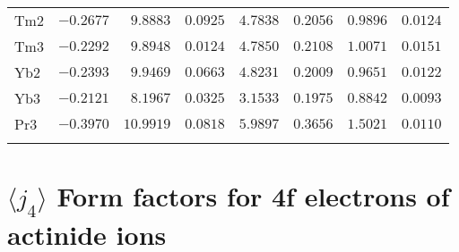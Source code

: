 \begin{table}[H]
{\begin{tabular}{lrrrrrrr}
Tm2 &$-0.2677$ &$9.8883$ &$0.0925$ &$4.7838$ &$0.2056$ &$0.9896$ &$0.0124$ \\
Tm3 &$-0.2292$ &$9.8948$ &$0.0124$ &$4.7850$ &$0.2108$ &$1.0071$ &$0.0151$ \\
Yb2 &$-0.2393$ &$9.9469$ &$0.0663$ &$4.8231$ &$0.2009$ &$0.9651$ &$0.0122$ \\
Yb3 &$-0.2121$ &$8.1967$ &$0.0325$ &$3.1533$ &$0.1975$ &$0.8842$ &$0.0093$ \\
Pr3 &$-0.3970$ &$10.9919$ &$0.0818$ &$5.9897$ &$0.3656$ &$1.5021$ &$0.0110$ \\
\hline\\[-2ex]
\end{tabular}
}
\end{table}
\section{{\large$\langle j_4\rangle$} Form factors for 4f electrons of actinide ions}
